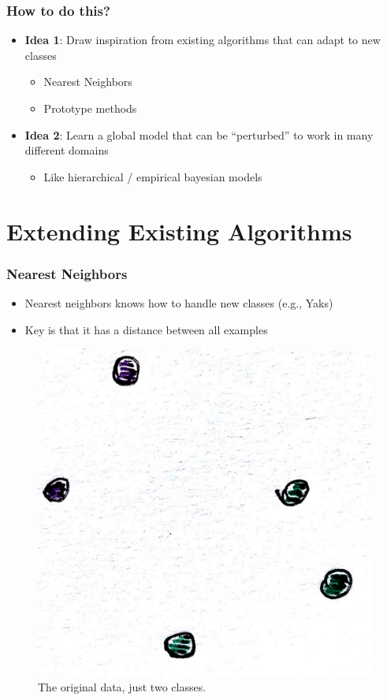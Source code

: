 \documentclass[10pt,mathserif]{beamer}
\begin{document}
\begin{frame}
  \frametitle{How to do this?}
  \begin{itemize}
  \item \textbf{Idea 1}: Draw inspiration from existing algorithms that can
    adapt to new classes
    \begin{itemize}
    \item Nearest Neighbors
    \item Prototype methods
    \end{itemize}
  \item \textbf{Idea 2}: Learn a global model that can be ``perturbed'' to work
    in many different domains
    \begin{itemize}
    \item Like hierarchical / empirical bayesian models
    \end{itemize}
  \end{itemize}
\end{frame}

\section{Extending Existing Algorithms}

\begin{frame}
  \frametitle{Nearest Neighbors}
  \begin{itemize}
  \item Nearest neighbors knows how to handle new classes (e.g., Yaks)
  \item Key is that it has a distance between all examples
  \end{itemize} 
  \begin{figure}[ht]
    \centering
    \includegraphics[width=0.40\paperwidth]{figure/nneighbor_1}
    \caption{The original data, just two classes. \label{fig:nneighbor_1} }
  \end{figure}
\end{frame}
\end{document}
